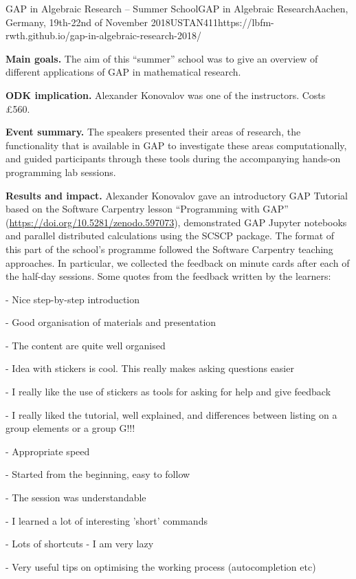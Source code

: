 \begin{event}{GAP in Algebraic Research -- Summer School}{GAP in Algebraic Research}{Aachen, Germany, 19th-22nd of November 2018}{USTAN}{41}{1}{https://lbfm-rwth.github.io/gap-in-algebraic-research-2018/}

\textbf{Main goals.} The aim of this ``summer'' school was 
to give an overview of different applications of GAP in mathematical research. 

\textbf{ODK implication.} Alexander Konovalov was one of the instructors. 
Costs \pounds 560.

\textbf{Event summary.} The speakers presented their areas of research, 
the functionality that is available in GAP to investigate these areas 
computationally, and guided participants through these tools during the 
accompanying hands-on programming lab sessions.

\textbf{Results and impact.} Alexander Konovalov
gave an introductory GAP Tutorial based on the 
Software Carpentry lesson ``Programming with GAP''
(\url{https://doi.org/10.5281/zenodo.597073}),
demonstrated GAP Jupyter notebooks and parallel 
distributed calculations using the SCSCP package.
The format of this part of the school's programme
followed the Software Carpentry teaching approaches.
In particular, we collected the feedback on minute
cards after each of the half-day sessions. Some quotes
from the feedback written by the learners:

- Nice step-by-step introduction

- Good organisation of materials and presentation

- The content are quite well organised 

- Idea with stickers is cool. This really makes asking questions easier

- I really like the use of stickers as tools for asking for help and give feedback

- I really liked the tutorial, well explained, and differences between listing on a group elements or a group G!!!

- Appropriate speed

- Started from the beginning, easy to follow

- The session was understandable

- I learned a lot of interesting 'short' commands

- Lots of shortcuts - I am very lazy

- Very useful tips on optimising the working process (autocompletion etc)


\end{event}
